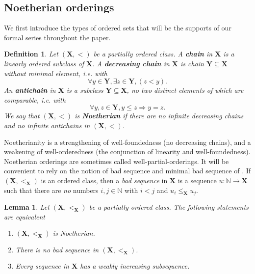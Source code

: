\documentclass{article}
\newcommand{\of}{:}
\newcommand{\tmem}[1]{{\em #1\/}}
\newcommand{\tmstrong}[1]{\textbf{#1}}
\newenvironment{enumeratealpha}{\begin{enumerate}[a{\textup{)}}] }{\end{enumerate}}
\newtheorem{definition}[theorem]{Definition}
\newtheorem{lemma}[theorem]{Lemma}
\theoremstyle{remark}\newtheorem*{convention*}{Convention}
\begin{document}
\subsection{Noetherian orderings}\label{subsection-Noetherian-orderings}

We first introduce the types of ordered sets that will be the supports of our
formal series throughout the paper.

\begin{definition}
  Let $(\mathbf{X}, <)$ be a partially ordered class. A
  {\tmem{{\tmstrong{chain}}}}{} in $\mathbf{X}$ is a linearly
  ordered subclass of $\mathbf{X}$. A {\tmem{{\tmstrong{decreasing
  chain}}}}{} in $\mathbf{X}$ is chain $\mathbf{Y}
  \subseteq \mathbf{X}$ without minimal element, i.e. with
  \[ \forall y \in \mathbf{Y}, \exists z \in \mathbf{Y}, (z < y) . \]
  An {\tmstrong{{\tmem{antichain}}}}{} in $\mathbf{X}$ is a
  subclass $\mathbf{Y} \subseteq \mathbf{X}$, no two distinct elements of
  which are comparable, i.e. with
  \[ \forall y, z \in \mathbf{Y}, y \leqslant z \Longrightarrow y = z. \]
  We say that $(\mathbf{X}, <)$ is
  {\tmstrong{{\tmem{Noetherian}}}}{} if there are
  no infinite decreasing chains and no infinite antichains in $(\mathbf{X},
  <)$.
\end{definition}

Noetherianity is a strengthening of well-foundedness (no decreasing chains),
and a weakening of well-orderedness (the conjunction of linearity and
well-foundedness). Noetherian orderings are sometimes called
well-partial-orderings. It will be convenient to rely on the notion of bad
sequence and minimal bad sequence of {\cite{NW63}}. If $(\mathbf{X},
<_{\mathbf{X}})$ is an ordered class, then a {\tmem{bad sequence}}{} in $\mathbf{X}$ is a sequence $u \of \mathbb{N} \longrightarrow
\mathbf{X}$ such that there are {\tmem{no}} numbers $i, j \in \mathbb{N}$ with
$i < j$ and $u_i \leqslant_{\mathbf{X}} u_j$.

\begin{lemma}
  \label{lem-Noeth-subsequence}{\tmem{{\cite[Theorem~2.1]{Hig52}}}} Let
  $(\mathbf{X}, <_{\mathbf{X}})$ be a partially ordered class. The following
  statements are equivalent
  \begin{enumeratealpha}
    \item $\label{lem-Noeth-subsequence-a} (\mathbf{X}, <_{\mathbf{X}})$ is
    Noetherian.
    
    \item \label{lem-Noeth-subsequence-b}There is no bad sequence in
    $(\mathbf{X}, <_{\mathbf{X}})$.
    
    \item \label{lem-Noeth-subsequence-c}Every sequence in $\mathbf{X}$ has a
    weakly increasing subsequence.
  \end{enumeratealpha}
\end{lemma}
\end{document}
